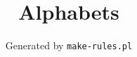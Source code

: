 \documentclass{article}
\begin{document}
\title{Alphabets}
\author{Generated by \tt make-rules.pl}
\maketitle
\tableofcontents
\newpage

\end{document}
